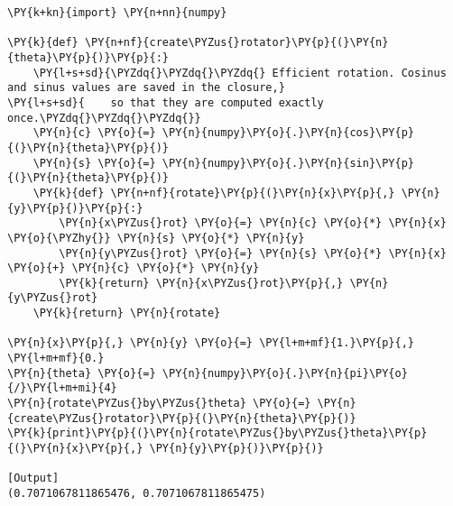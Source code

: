 \begin{Verbatim}[label=\makebox{\url{https://github.com/lucabaldini/cmepda/tree/master/slides/latex/snippets/rotator.py}},commandchars=\\\{\}]
\PY{k+kn}{import} \PY{n+nn}{numpy}

\PY{k}{def} \PY{n+nf}{create\PYZus{}rotator}\PY{p}{(}\PY{n}{theta}\PY{p}{)}\PY{p}{:}
    \PY{l+s+sd}{\PYZdq{}\PYZdq{}\PYZdq{} Efficient rotation. Cosinus and sinus values are saved in the closure,}
\PY{l+s+sd}{    so that they are computed exactly once.\PYZdq{}\PYZdq{}\PYZdq{}}
    \PY{n}{c} \PY{o}{=} \PY{n}{numpy}\PY{o}{.}\PY{n}{cos}\PY{p}{(}\PY{n}{theta}\PY{p}{)}
    \PY{n}{s} \PY{o}{=} \PY{n}{numpy}\PY{o}{.}\PY{n}{sin}\PY{p}{(}\PY{n}{theta}\PY{p}{)}
    \PY{k}{def} \PY{n+nf}{rotate}\PY{p}{(}\PY{n}{x}\PY{p}{,} \PY{n}{y}\PY{p}{)}\PY{p}{:}
        \PY{n}{x\PYZus{}rot} \PY{o}{=} \PY{n}{c} \PY{o}{*} \PY{n}{x} \PY{o}{\PYZhy{}} \PY{n}{s} \PY{o}{*} \PY{n}{y}
        \PY{n}{y\PYZus{}rot} \PY{o}{=} \PY{n}{s} \PY{o}{*} \PY{n}{x} \PY{o}{+} \PY{n}{c} \PY{o}{*} \PY{n}{y}
        \PY{k}{return} \PY{n}{x\PYZus{}rot}\PY{p}{,} \PY{n}{y\PYZus{}rot}
    \PY{k}{return} \PY{n}{rotate}

\PY{n}{x}\PY{p}{,} \PY{n}{y} \PY{o}{=} \PY{l+m+mf}{1.}\PY{p}{,} \PY{l+m+mf}{0.}
\PY{n}{theta} \PY{o}{=} \PY{n}{numpy}\PY{o}{.}\PY{n}{pi}\PY{o}{/}\PY{l+m+mi}{4}
\PY{n}{rotate\PYZus{}by\PYZus{}theta} \PY{o}{=} \PY{n}{create\PYZus{}rotator}\PY{p}{(}\PY{n}{theta}\PY{p}{)}
\PY{k}{print}\PY{p}{(}\PY{n}{rotate\PYZus{}by\PYZus{}theta}\PY{p}{(}\PY{n}{x}\PY{p}{,} \PY{n}{y}\PY{p}{)}\PY{p}{)}

[Output]
(0.7071067811865476, 0.7071067811865475)
\end{Verbatim}